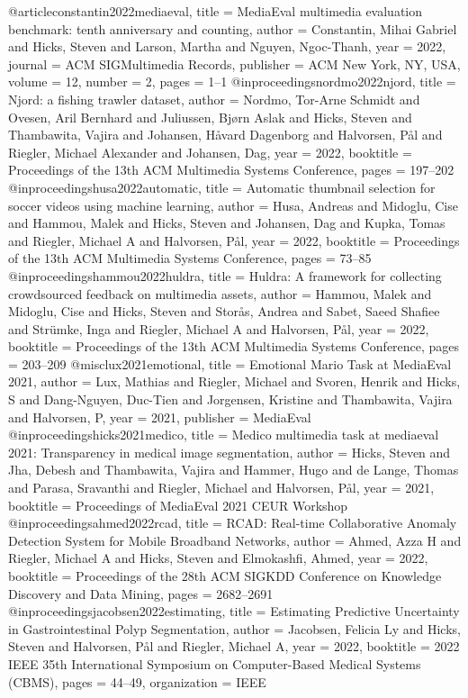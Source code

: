 @article{constantin2022mediaeval,
	title = {MediaEval multimedia evaluation benchmark: tenth anniversary and counting},
	author = {Constantin, Mihai Gabriel and Hicks, Steven and Larson, Martha and Nguyen, Ngoc-Thanh},
	year = 2022,
	journal = {ACM SIGMultimedia Records},
	publisher = {ACM New York, NY, USA},
	volume = 12,
	number = 2,
	pages = {1--1}
}
@inproceedings{nordmo2022njord,
	title = {Njord: a fishing trawler dataset},
	author = {Nordmo, Tor-Arne Schmidt and Ovesen, Aril Bernhard and Juliussen, Bj{\o}rn Aslak and Hicks, Steven and Thambawita, Vajira and Johansen, H{\aa}vard Dagenborg and Halvorsen, P{\aa}l and Riegler, Michael Alexander and Johansen, Dag},
	year = 2022,
	booktitle = {Proceedings of the 13th ACM Multimedia Systems Conference},
	pages = {197--202}
}
@inproceedings{husa2022automatic,
	title = {Automatic thumbnail selection for soccer videos using machine learning},
	author = {Husa, Andreas and Midoglu, Cise and Hammou, Malek and Hicks, Steven and Johansen, Dag and Kupka, Tomas and Riegler, Michael A and Halvorsen, P{\aa}l},
	year = 2022,
	booktitle = {Proceedings of the 13th ACM Multimedia Systems Conference},
	pages = {73--85}
}
@inproceedings{hammou2022huldra,
	title = {Huldra: A framework for collecting crowdsourced feedback on multimedia assets},
	author = {Hammou, Malek and Midoglu, Cise and Hicks, Steven and Stor{\aa}s, Andrea and Sabet, Saeed Shafiee and Str{\"u}mke, Inga and Riegler, Michael A and Halvorsen, P{\aa}l},
	year = 2022,
	booktitle = {Proceedings of the 13th ACM Multimedia Systems Conference},
	pages = {203--209}
}
@misc{lux2021emotional,
	title = {Emotional Mario Task at MediaEval 2021},
	author = {Lux, Mathias and Riegler, Michael and Svoren, Henrik and Hicks, S and Dang-Nguyen, Duc-Tien and Jorgensen, Kristine and Thambawita, Vajira and Halvorsen, P},
	year = 2021,
	publisher = {MediaEval}
}
@inproceedings{hicks2021medico,
	title = {Medico multimedia task at mediaeval 2021: Transparency in medical image segmentation},
	author = {Hicks, Steven and Jha, Debesh and Thambawita, Vajira and Hammer, Hugo and de Lange, Thomas and Parasa, Sravanthi and Riegler, Michael and Halvorsen, P{\aa}l},
	year = 2021,
	booktitle = {Proceedings of MediaEval 2021 CEUR Workshop}
}
@inproceedings{ahmed2022rcad,
	title = {RCAD: Real-time Collaborative Anomaly Detection System for Mobile Broadband Networks},
	author = {Ahmed, Azza H and Riegler, Michael A and Hicks, Steven and Elmokashfi, Ahmed},
	year = 2022,
	booktitle = {Proceedings of the 28th ACM SIGKDD Conference on Knowledge Discovery and Data Mining},
	pages = {2682--2691}
}
@inproceedings{jacobsen2022estimating,
	title = {Estimating Predictive Uncertainty in Gastrointestinal Polyp Segmentation},
	author = {Jacobsen, Felicia Ly and Hicks, Steven and Halvorsen, P{\aa}l and Riegler, Michael A},
	year = 2022,
	booktitle = {2022 IEEE 35th International Symposium on Computer-Based Medical Systems (CBMS)},
	pages = {44--49},
	organization = {IEEE}
}
